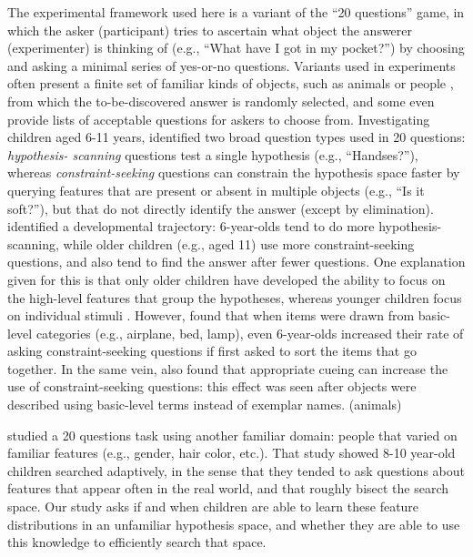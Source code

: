 \documentclass[10pt,letterpaper]{article}
\begin{document}
The experimental framework used here is a variant of the ``20 questions'' game, in 
which the asker (participant) tries to ascertain what object the answerer 
(experimenter) is thinking of (e.g., ``What have I got in my pocket?'') by choosing 
and asking a minimal series of yes-or-no questions. Variants used in experiments 
often present a finite set of familiar kinds of objects, such as animals \cite{Ruggeri:
2015front} or people \cite{Nelson:2014}, from which the to-be-discovered answer is 
randomly selected, and some even provide lists of acceptable questions for askers 
to choose from. Investigating children aged 6-11 years,  
identified two broad question types used in 20 questions: \emph{hypothesis-
scanning} questions test a single hypothesis (e.g., ``Handses?''), whereas 
\emph{constraint-seeking} questions can constrain the hypothesis space faster by 
querying features that are present or absent in multiple objects (e.g., ``Is it soft?''), 
but that do not directly identify the answer (except by elimination).  identified a developmental trajectory: 6-year-olds tend to do more hypothesis-
scanning, while older children (e.g., aged 11) use more constraint-seeking 
questions, and also tend to find the answer after fewer questions. One explanation 
given for this is that only older children have developed the ability to focus on the 
high-level features that group the hypotheses, whereas younger children focus on 
individual stimuli \cite{Mosher:1966,Ruggeri:2015front}. However,  found that when items were drawn from basic-level categories (e.g., airplane, 
bed, lamp), even 6-year-olds increased their rate of asking constraint-seeking 
questions if first asked to sort the items that go together. In the same vein, 
 also found that appropriate cueing can increase the use of 
constraint-seeking questions: this effect was seen after objects were described 
using basic-level terms instead of exemplar names. (animals)

 studied a 20 questions task using another familiar domain: 
people that varied on familiar features (e.g., gender, hair color, etc.). That study 
showed 8-10 year-old children searched adaptively, in the sense that they tended to 
ask questions about features that appear often in the real world, and that roughly 
bisect the search space. Our study asks if and when children are able to learn these 
feature distributions in an unfamiliar hypothesis space, and whether they are able to 
use this knowledge to efficiently search that space.
\end{document}
